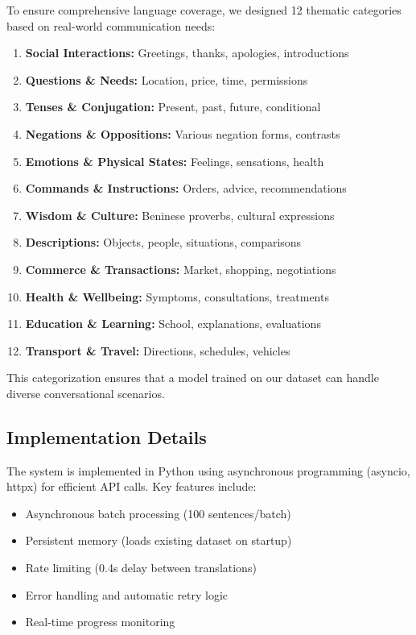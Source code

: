 \documentclass[10pt,twocolumn]{article}
\begin{document}
To ensure comprehensive language coverage, we designed 12 thematic categories based on real-world communication needs:

\begin{enumerate}[leftmargin=*,noitemsep,topsep=0pt]
    \item \textbf{Social Interactions:} Greetings, thanks, apologies, introductions
    \item \textbf{Questions \& Needs:} Location, price, time, permissions
    \item \textbf{Tenses \& Conjugation:} Present, past, future, conditional
    \item \textbf{Negations \& Oppositions:} Various negation forms, contrasts
    \item \textbf{Emotions \& Physical States:} Feelings, sensations, health
    \item \textbf{Commands \& Instructions:} Orders, advice, recommendations
    \item \textbf{Wisdom \& Culture:} Beninese proverbs, cultural expressions
    \item \textbf{Descriptions:} Objects, people, situations, comparisons
    \item \textbf{Commerce \& Transactions:} Market, shopping, negotiations
    \item \textbf{Health \& Wellbeing:} Symptoms, consultations, treatments
    \item \textbf{Education \& Learning:} School, explanations, evaluations
    \item \textbf{Transport \& Travel:} Directions, schedules, vehicles
\end{enumerate}

This categorization ensures that a model trained on our dataset can handle diverse conversational scenarios.

\subsection{Implementation Details}

The system is implemented in Python using asynchronous programming (asyncio, httpx) for efficient API calls. Key features include:
\begin{itemize}[leftmargin=*,noitemsep,topsep=0pt]
    \item Asynchronous batch processing (100 sentences/batch)
    \item Persistent memory (loads existing dataset on startup)
    \item Rate limiting (0.4s delay between translations)
    \item Error handling and automatic retry logic
    \item Real-time progress monitoring
\end{itemize}
\end{document}
